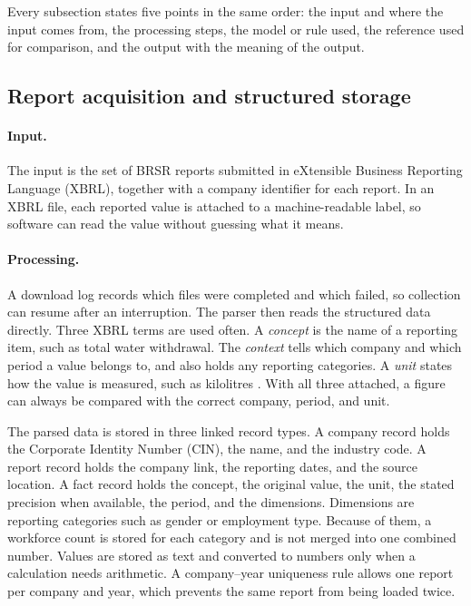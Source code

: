 Every subsection states five points in the same order: the input and where the input comes from, the processing steps, the model or rule used, the reference used for comparison, and the output with the meaning of the output.

\subsection{Report acquisition and structured storage}
\label{sec:ingestion}

\paragraph{Input.} The input is the set of BRSR reports submitted in eXtensible Business Reporting Language (XBRL), together with a company identifier for each report. In an XBRL file, each reported value is attached to a machine-readable label, so software can read the value without guessing what it means.

\paragraph{Processing.} A download log records which files were completed and which failed, so collection can resume after an interruption. The parser then reads the structured data directly. Three XBRL terms are used often. A \emph{concept} is the name of a reporting item, such as total water withdrawal. The \emph{context} tells which company and which period a value belongs to, and also holds any reporting categories. A \emph{unit} states how the value is measured, such as kilolitres \cite{xbrl2013}. With all three attached, a figure can always be compared with the correct company, period, and unit.

The parsed data is stored in three linked record types. A company record holds the Corporate Identity Number (CIN), the name, and the industry code. A report record holds the company link, the reporting dates, and the source location. A fact record holds the concept, the original value, the unit, the stated precision when available, the period, and the dimensions. Dimensions are reporting categories such as gender or employment type. Because of them, a workforce count is stored for each category and is not merged into one combined number. Values are stored as text and converted to numbers only when a calculation needs arithmetic. A company--year uniqueness rule allows one report per company and year, which prevents the same report from being loaded twice.

